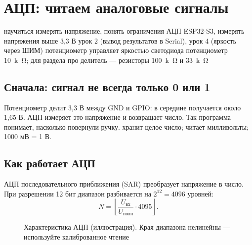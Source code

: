 \section{АЦП: читаем аналоговые сигналы}\label{les:adc}
\lessonintro
  {научиться измерять напряжение, понять ограничения АЦП ESP32-S3, измерять напряжения выше 3,3 В}
  {урок 2 (вывод результатов в Serial), урок 4 (яркость через ШИМ)}
  {потенциометр управляет яркостью светодиода}
  {потенциометр \SI{10}{k\ohm}; для раздела про делитель --- резисторы \SI{100}{k\ohm} и \SI{33}{k\ohm}}

\subsection{Сначала: сигнал не всегда только 0 или 1}

Потенциометр делит 3,3 В между GND и GPIO: в середине получается около 1,65 В. АЦП измеряет это
напряжение и возвращает число. Так программа понимает, насколько повернули ручку.  хранит
целое число;  читает милливольты; 1000 мВ = 1 В.

\subsection{Как работает АЦП}

АЦП последовательного приближения (SAR) преобразует напряжение в число. При разрешении 12 бит
диапазон разбивается на $2^{12} = 4096$ уровней:
\[
  N = \left\lfloor \frac{U_\text{вх}}{U_\text{полн}} \cdot 4095 \right\rfloor .
\]

\begin{figure}[H]
\centering
{}
\caption{Характеристика АЦП (иллюстрация). Края диапазона нелинейны --- используйте калиброванное чтение}
\end{figure}

